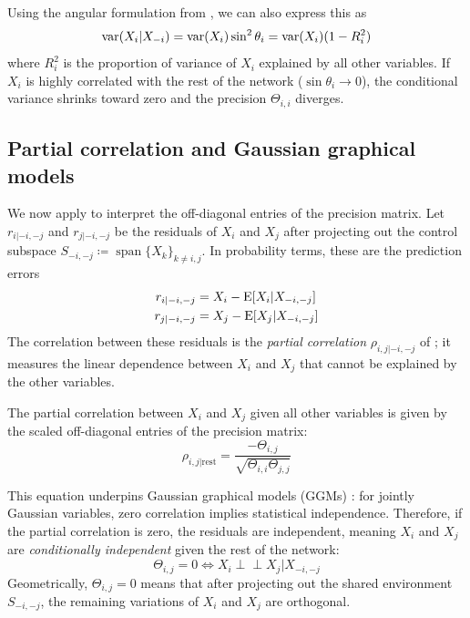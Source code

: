 \documentclass{IEEEtran}
\begin{document}
Using the angular formulation from , we can also express this as
\begin{equation}
  \operatorname{var}(X_{i} | X_{- i})
  = \operatorname{var}(X_{i}) \sin^{2}\theta_{i}
  = \operatorname{var}(X_{i}) (1 - R_{i}^{2})
  \label{eq:conditional-variance-angle}
\end{equation}
where $R_{i}^{2}$ is the proportion of variance of $X_{i}$ explained by all other variables. If $X_{i}$ is highly correlated with the rest of the network ($\sin\theta_{i} \to 0$), the conditional variance shrinks toward zero and the precision $\Theta_{i,i}$ diverges.

\subsection{Partial correlation and Gaussian graphical models}

We now apply  to interpret the off-diagonal entries of the precision matrix. Let $r_{i|-i,-j}$ and $r_{j|-i,-j}$ be the residuals of $X_{i}$ and $X_{j}$ after projecting out the control subspace $S_{-i,-j} \coloneq \operatorname{span} \{X_{k}\}_{k \neq i,j}$. In probability terms, these are the prediction errors
\begin{equation*}
  \begin{aligned}
    r_{i|-i,-j} &= X_{i} - \operatorname{E}[X_{i} | X_{- i,-j}] \\
    r_{j|-i,-j} &= X_{j} - \operatorname{E}[X_{j} | X_{- i,-j}]
  \end{aligned}
\end{equation*}
The correlation between these residuals is the \emph{partial correlation} $\rho_{i,j|-i,-j}$ of ; it measures the linear dependence between $X_{i}$ and $X_{j}$ that cannot be explained by the other variables.

\begin{corollary}
  \label{cor:precision-offdiag}
  The partial correlation between $X_{i}$ and $X_{j}$ given all other variables is given by the scaled off-diagonal entries of the precision matrix:
  \begin{equation*}
    \rho_{i,j | \mathrm{rest}}
    = \frac{-\Theta_{i,j}}{\sqrt{\Theta_{i,i} \Theta_{j,j}}}
  \end{equation*}
\end{corollary}

This equation underpins Gaussian graphical models (GGMs) \cite{lauritzen1996}: for jointly Gaussian variables, zero correlation implies statistical independence. Therefore, if the partial correlation is zero, the residuals are independent, meaning $X_{i}$ and $X_{j}$ are \emph{conditionally independent} given the rest of the network:
\begin{equation}
  \Theta_{i,j} = 0 \iff X_{i} \perp\!\!\!\perp X_{j} | X_{- i,-j}
  \label{eq:ggm}
\end{equation}
Geometrically, $\Theta_{i,j} = 0$ means that after projecting out the shared environment $S_{-i,-j}$, the remaining variations of $X_{i}$ and $X_{j}$ are orthogonal.
\end{document}
